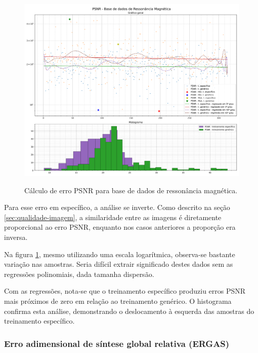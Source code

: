 \begin{figure}[H]
    \centering
    \caption{Cálculo de erro PSNR para base de dados de ressonância magnética.}
    \includegraphics[width=16cm]{fig/resultados/mri/png/psnr_mri_compound.png}
    \label{fig:results:fig3}
\end{figure}

Para esse erro em específico, a análise se inverte. Como descrito na seção \ref{sec:qualidade-imagem}, a similaridade entre as imagens é diretamente proporcional ao erro PSNR, enquanto nos casos anteriores a proporção era inversa.

Na figura \ref{fig:results:fig3}, mesmo utilizando uma escala logarítmica, observa-se bastante variação nas amostras. Seria difícil extrair significado destes dados sem as regressões polinomiais, dada tamanha dispersão. 

Com as regressões, nota-se que o treinamento específico produziu erros PSNR mais próximos de zero em relação ao treinamento genérico. O histograma confirma esta análise, demonstrando o deslocamento à esquerda das amostras do treinamento específico.

\subsubsection{Erro adimensional de síntese global relativa (ERGAS)}
\label{sec:result:mri:ergas}

